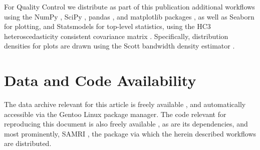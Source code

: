 For Quality Control we distribute as part of this publication additional workflows using the NumPy \cite{numpy}, SciPy \cite{scipy}, pandas \cite{pandas}, and matplotlib packages \cite{matplotlib}, as well as Seaborn \cite{seaborn} for plotting, and Statsmodels \cite{statsmodels} for top-level statistics, using the HC3 heteroscedasticity consistent covariance matrix \cite{long2000}.
Specifically, distribution densities for plots are drawn using the Scott bandwidth density estimator \cite{Scott1979}.

\section{Data and Code Availability}

The data archive relevant for this article is freely available \cite{mlebe_bidsdata}, and automatically accessible via the Gentoo Linux package manager.
The code relevant for reproducing this document is also freely available \cite{source}, as are its dependencies, and most prominently, SAMRI \cite{samri}, the package via which the herein described workflows are distributed.

